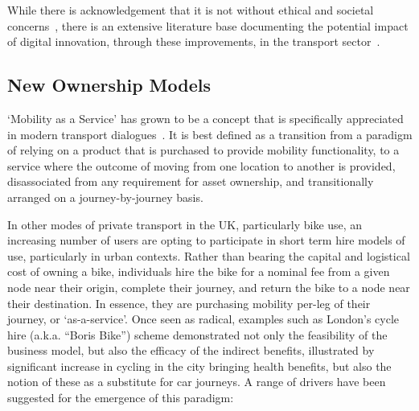 \documentclass[journal]{IEEEtran}
\begin{document}
While there is acknowledgement that it is not without ethical and
societal concerns~\cite{bimber:1990,oatley-et-al_dasc:2015}, there is
an extensive literature base documenting the potential impact of
digital innovation, through these improvements, in the transport
sector~\cite{enoch:2015}.


\subsection{New Ownership Models}

`Mobility as a Service' has grown to be a concept that is specifically
appreciated in modern transport dialogues~\cite{tscatapult:2016}. It
is best defined as a transition from a paradigm of relying on a
product that is purchased to provide mobility functionality, to a
service where the outcome of moving from one location to another is
provided, disassociated from any requirement for asset ownership, and
transitionally arranged on a journey-by-journey basis.

In other modes of private transport in the UK, particularly bike use,
an increasing number of users are opting to participate in short term
hire models of use, particularly in urban contexts. Rather than
bearing the capital and logistical cost of owning a bike, individuals
hire the bike for a nominal fee from a given node near their origin,
complete their journey, and return the bike to a node near their
destination. In essence, they are purchasing mobility per-leg of their
journey, or `as-a-service'. Once seen as radical, examples such as
London’s cycle hire (a.k.a. ``Boris Bike'') scheme demonstrated not
only the feasibility of the business model, but also the efficacy of
the indirect benefits, illustrated by significant increase in cycling
in the city bringing health benefits, but also the notion of these as
a substitute for car journeys. A range of drivers have been suggested
for the emergence of this paradigm:
\end{document}
